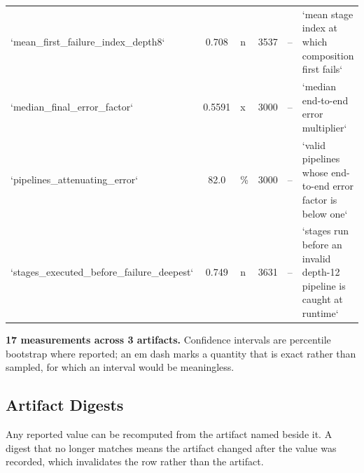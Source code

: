 \documentclass[10pt,journal,compsoc,twocolumn]{IEEEtran}
\begin{document}
\begin{table}[htbp]
{\begin{tabular}{lclcll}
`mean\_first\_failure\_index\_depth8` & 0.708 & n & 3537 & -- & `mean stage index at which composition first fails` \\
`median\_final\_error\_factor` & 0.5591 & x & 3000 & -- & `median end-to-end error multiplier` \\
`pipelines\_attenuating\_error` & 82.0 & \% & 3000 & -- & `valid pipelines whose end-to-end error factor is below one` \\
`stages\_executed\_before\_failure\_deepest` & 0.749 & n & 3631 & -- & `stages run before an invalid depth-12 pipeline is caught at runtime` \\
\bottomrule
\end{tabular}}
\end{table}

\textbf{17 measurements across 3 artifacts.} Confidence intervals are percentile bootstrap where reported; an em dash marks a quantity that is exact rather than sampled, for which an interval would be meaningless.


\subsection{Artifact Digests}
\begin{table}[htbp]
\centering
{}
\end{table}

Any reported value can be recomputed from the artifact named beside it. A digest that no longer matches means the artifact changed after the value was recorded, which invalidates the row rather than the artifact.


\par\vspace{0.5em}



\end{document}
